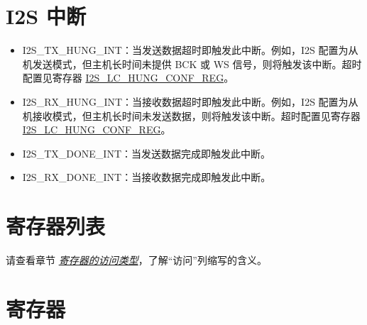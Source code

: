 \documentclass[main\_\_CN.tex]{subfiles}
\begin{document}
\section{I2S 中断} \label{sec:i2s-interrupts}

\begin{itemize}
\item \label{int:I2STXHUNGINT}I2S\_TX\_HUNG\_INT：当发送数据超时即触发此中断。例如，I2S 配置为从机发送模式，但主机长时间未提供 BCK 或 WS 信号，则将触发该中断。超时配置见寄存器 \hyperref[regdesc:I2SLCHUNGCONFREG]{I2S\_LC\_HUNG\_CONF\_REG}。
\item \label{int:I2SRXHUNGINT}I2S\_RX\_HUNG\_INT：当接收数据超时即触发此中断。例如，I2S 配置为从机接收模式，但主机长时间未发送数据，则将触发该中断。超时配置见寄存器 \hyperref[regdesc:I2SLCHUNGCONFREG]{I2S\_LC\_HUNG\_CONF\_REG}。
\item \label{int:I2STXDONEINT}I2S\_TX\_DONE\_INT：当发送数据完成即触发此中断。
\item \label{int:I2SRXDONEINT}I2S\_RX\_DONE\_INT：当接收数据完成即触发此中断。
\end{itemize}


\section{寄存器列表}\hypertarget{i2s-reg-summ}{}

请查看章节 \hyperref[glossary-access-types]{\textit{寄存器的访问类型}}，了解“访问”列缩写的含义。


\section{寄存器}\label{sec:i2s-registers}

\end{document}
